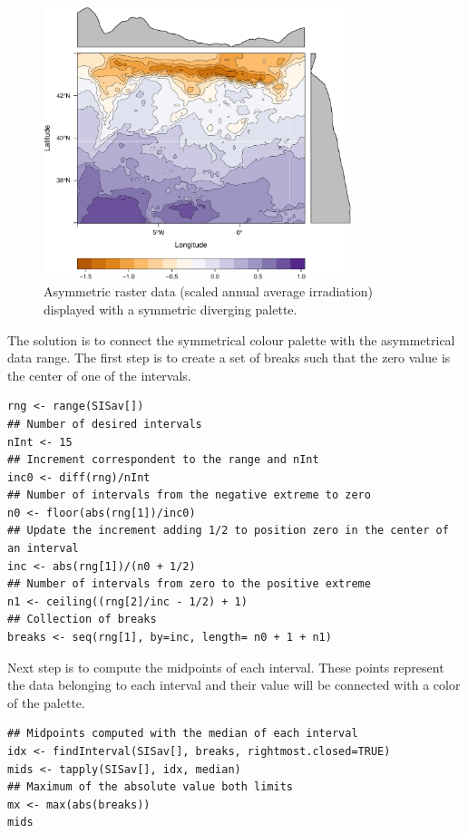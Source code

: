 \begin{figure}[h!]
\centering
\includegraphics[width=0.8\textwidth]{figs/divPal_SISav_naive.pdf}
\caption{\label{fig:divPal_SISav_naive}Asymmetric raster data (scaled annual average irradiation) displayed with a symmetric diverging palette.}
\end{figure}

The solution is to connect the symmetrical colour palette with the
asymmetrical data range. The first step is to create a set of
breaks such that the zero value is the center of one of the
intervals.

\lstset{language=R}
\begin{lstlisting}
rng <- range(SISav[])
## Number of desired intervals
nInt <- 15
## Increment correspondent to the range and nInt
inc0 <- diff(rng)/nInt
## Number of intervals from the negative extreme to zero
n0 <- floor(abs(rng[1])/inc0)
## Update the increment adding 1/2 to position zero in the center of an interval
inc <- abs(rng[1])/(n0 + 1/2)
## Number of intervals from zero to the positive extreme
n1 <- ceiling((rng[2]/inc - 1/2) + 1)
## Collection of breaks
breaks <- seq(rng[1], by=inc, length= n0 + 1 + n1)
\end{lstlisting}

Next step is to compute the midpoints of each interval. These
points represent the data belonging to each interval and their
value will be connected with a color of the palette.

\lstset{language=R}
\begin{lstlisting}
## Midpoints computed with the median of each interval
idx <- findInterval(SISav[], breaks, rightmost.closed=TRUE)
mids <- tapply(SISav[], idx, median)
## Maximum of the absolute value both limits
mx <- max(abs(breaks))
mids
\end{lstlisting}


